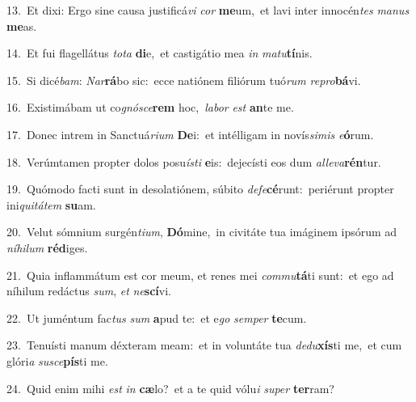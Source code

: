 {\numbfont\textcolor{\numbcolor}{13.}}~Et dixi: Ergo sine causa justificá\textit{vi} \textit{cor} \textbf{me}\-um,~\star et lavi inter innocén\textit{tes} \textit{ma}\-\textit{nus} \textbf{me}\-as.\par
{\numbfont\textcolor{\numbcolor}{14.}}~Et fui flagellátus \textit{to}\-\textit{ta} \textbf{di}\-e,~\star et castigátio mea \textit{in} \textit{ma}\-\textit{tu}\textbf{tí}nis.\par
{\numbfont\textcolor{\numbcolor}{15.}}~Si dicé\-\textit{bam}\-: \textit{Nar}\-\textbf{rá}bo sic:~\star ecce natiónem filiórum tuó\textit{rum} \textit{re}\-\textit{pro}\textbf{bá}vi.\par
{\numbfont\textcolor{\numbcolor}{16.}}~Existimábam ut co\-\textit{gnó}\-\textit{sce}\textbf{rem} hoc,~\star \textit{la}\-\textit{bor} \textit{est} \textbf{an}\-te me.\par
{\numbfont\textcolor{\numbcolor}{17.}}~Donec intrem in Sanctuá\-\textit{ri}\-\textit{um} \textbf{De}\-i:~\star et intélligam in novís\-\textit{si}\-\textit{mis} \textit{e}\-\textbf{ó}rum.\par
{\numbfont\textcolor{\numbcolor}{18.}}~Verúmtamen propter dolos posu\-\textit{ís}\-\textit{ti} \textbf{e}\-is:~\star dejecísti eos dum \textit{al}\-\textit{le}\textit{va}\textbf{rén}tur.\par
{\numbfont\textcolor{\numbcolor}{19.}}~Quómodo facti sunt in desolatiónem, súbito \textit{de}\-\textit{fe}\textbf{cé}runt:~\star periérunt propter ini\-\textit{qui}\-\textit{tá}\textit{tem} \textbf{su}\-am.\par
{\numbfont\textcolor{\numbcolor}{20.}}~Velut sómnium surgén\-\textit{ti}\-\textit{um}, \textbf{Dó}\-mine,~\star in civitáte tua imáginem ipsórum ad \textit{ní}\-\textit{hi}\textit{lum} \textbf{réd}\-iges.\par
{\numbfont\textcolor{\numbcolor}{21.}}~Quia inflammátum est cor meum, et renes mei \textit{com}\-\textit{mu}\textbf{tá}ti sunt:~\star et ego ad níhilum redáctus \textit{sum}\-, \textit{et} \textit{ne}\-\textbf{scí}vi.\par
{\numbfont\textcolor{\numbcolor}{22.}}~Ut juméntum fac\textit{tus} \textit{sum} \textbf{a}\-pud te:~\star et e\textit{go} \textit{sem}\-\textit{per} \textbf{te}\-cum.\par
{\numbfont\textcolor{\numbcolor}{23.}}~Tenuísti manum déxteram meam:~\dagger et in voluntáte tua \textit{de}\-\textit{du}\textbf{xís}ti me,~\star et cum glóri\textit{a} \textit{su}\-\textit{sce}\textbf{pís}ti me.\par
{\numbfont\textcolor{\numbcolor}{24.}}~Quid enim mihi \textit{est} \textit{in} \textbf{cæ}\-lo?~\star et a te quid vólu\textit{i} \textit{su}\-\textit{per} \textbf{ter}\-ram?\par
